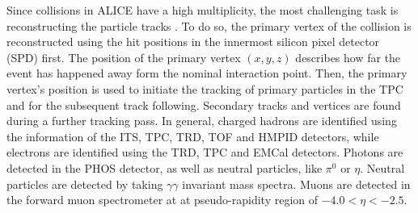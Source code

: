 \documentclass[
  a4paper,
  12pt,
  oneside,
  parskip=half,
  listof=totoc,
  bibliography=totoc,
  DIV=12,
  numbers=noenddot,
  BA.tex
  ]{subfiles}
\begin{document}
Since collisions in ALICE have a high multiplicity, the most challenging task is reconstructing the particle tracks \cite{collaboration_alice_2008}. To do so, the primary vertex of the collision is reconstructed using the hit positions in the innermost silicon pixel detector (SPD) first. The position of the primary vertex $(x,y,z)$ describes how far the event has happened away form the nominal interaction point. Then, the primary vertex's position is used to initiate the tracking of primary particles in the TPC and for the subsequent track following. Secondary tracks and vertices are found during a further tracking pass. In general, charged hadrons are identified using the information of the ITS, TPC, TRD, TOF and HMPID detectors, while electrons are identified using the TRD, TPC and EMCal detectors. Photons are detected in the PHOS detector, as well as neutral particles, like $\pi^0$ or $\eta$. Neutral particles are detected by taking $\gamma \gamma$ invariant mass spectra. Muons are detected in the forward muon spectrometer at at pseudo-rapidity region of $-4.0 < \eta < -2.5$. 
\end{document}
